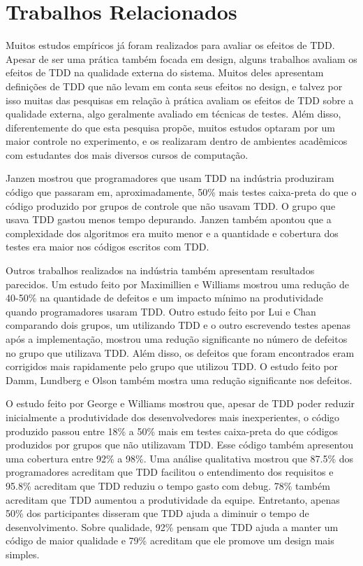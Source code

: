 \chapter{Trabalhos Relacionados}
\label{cap:trabalhos-relacionados}

Muitos estudos empíricos já foram realizados para avaliar os efeitos de TDD.
Apesar de ser uma prática também focada em design, alguns trabalhos avaliam
os efeitos de TDD na qualidade externa do sistema. 
Muitos deles apresentam definições
de TDD que não levam em conta seus efeitos no design, e talvez por isso muitas das 
pesquisas em relação à prática avaliam os efeitos de TDD sobre a qualidade 
externa, algo geralmente avaliado em técnicas de testes.
Além disso, diferentemente
do que esta pesquisa propõe, muitos estudos optaram por um
maior controle no experimento, e os realizaram dentro de ambientes acadêmicos 
com estudantes dos mais diversos cursos de computação.

Janzen \cite{janzen-arch-improvement} mostrou que programadores que usam TDD na 
indústria produziram código que passaram em, aproximadamente, 50\% mais testes 
caixa-preta do que o código produzido por grupos de controle que não usavam TDD.
O grupo que usava TDD gastou menos tempo depurando. Janzen também 
apontou que a complexidade dos algoritmos era muito menor e a quantidade e
cobertura dos testes era maior nos códigos escritos com TDD.

Outros trabalhos realizados na indústria também apresentam resultados parecidos.
Um estudo feito por Maximillien e Williams \cite{max-e-williams} mostrou uma
redução de 40-50\% na quantidade de defeitos e um impacto mínimo na
produtividade quando programadores usaram TDD. Outro estudo feito por Lui e
Chan \cite{lui-e-chan} comparando dois grupos, um utilizando TDD e o outro 
escrevendo testes apenas após a implementação, mostrou uma redução significante 
no número de defeitos no grupo que utilizava TDD. 
Além disso, os defeitos que foram encontrados eram 
corrigidos mais rapidamente pelo grupo que utilizou TDD. O estudo feito por 
Damm, Lundberg e Olson \cite{damn-lundberg-e-olson} também mostra uma redução
significante nos defeitos.

O estudo feito por George e Williams \cite{george-e-williams} mostrou que,
apesar de TDD poder reduzir inicialmente a produtividade dos desenvolvedores 
mais inexperientes, o código produzido passou entre 18\% a 50\% mais em testes 
caixa-preta do que códigos produzidos por grupos que não utilizavam TDD. Esse
código também apresentou uma cobertura entre 92\% a 98\%. Uma análise
qualitativa mostrou que 87.5\% dos programadores acreditam que TDD facilitou o 
entendimento dos requisitos e 95.8\% acreditam que TDD reduziu o tempo gasto com
debug. 78\% também acreditam que TDD aumentou a produtividade da equipe. 
Entretanto, apenas 50\% dos participantes disseram que TDD ajuda a diminuir o tempo de 
desenvolvimento. Sobre qualidade, 92\% pensam que TDD ajuda a manter um
código de maior qualidade e 79\% acreditam que ele promove um design mais simples.

